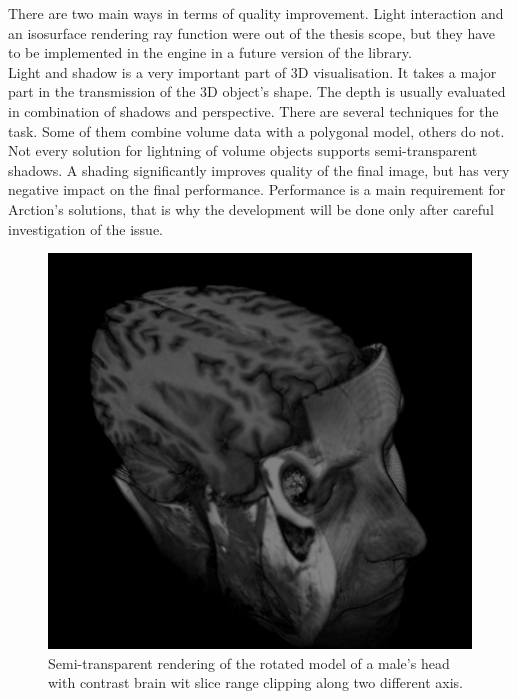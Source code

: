 \documentclass[twoside, english, 11pt]{report}
\begin{document}
There are two main ways in terms of quality improvement. Light interaction and an isosurface rendering ray function were out of the thesis scope, but they have to be implemented in the engine in a future version of the library.\\

Light and shadow is a very important part of 3D visualisation. It takes a major part in the transmission of the 3D object's shape. The depth is usually evaluated in combination of shadows and perspective. There are several techniques for the task. Some of them combine volume data with a polygonal model, others do not. Not every solution for lightning of volume objects supports semi-transparent shadows. A shading significantly improves quality of the final image, but has very negative impact on the final performance. Performance is a main requirement for Arction's solutions, that is why the development will be done only after careful investigation of the issue.\\


\begin{figure}[H]
\centerline{\includegraphics[scale = 0.7]{img/cuttedhead}}
\caption{Semi-transparent rendering of the rotated model of a male's head with contrast brain wit slice range clipping along two different axis.\label{fig:cuttedhead}}
\end{figure}
\end{document}
